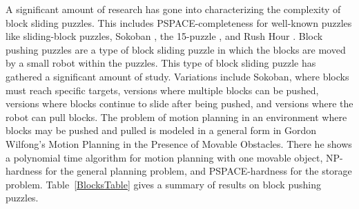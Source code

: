 %

A significant amount of research has gone into characterizing the complexity of block sliding puzzles. This includes PSPACE-completeness for well-known puzzles like sliding-block puzzles\cite{hearn2005pspace}, Sokoban \cite{Sokoban98, DZ96}, the 15-puzzle \cite{15Puzzle}, and Rush Hour \cite{RushHour02}. Block pushing puzzles are a type of block sliding puzzle in which the blocks are moved by a small robot within the puzzles. This type of block sliding puzzle has gathered a significant amount of study. Variations include Sokoban\cite{Sokoban98, DZ96}, where blocks must reach specific targets, versions where multiple blocks can be pushed\cite{Push100, Push*00, Push2F02}, versions where blocks continue to slide after being pushed\cite{PushPushk04, Push*00}, and versions where the robot can pull blocks\cite{Pull10}. The problem of motion planning in an environment where blocks may be pushed and pulled is modeled in a general form in Gordon Wilfong's Motion Planning in the Presence of Movable Obstacles\cite{PushPull91}. There he shows a polynomial time algorithm for motion planning with one movable object, NP-hardness for the general planning problem, and PSPACE-hardness for the storage problem. Table~\ref{BlocksTable} gives a summary of results on block pushing puzzles. 

